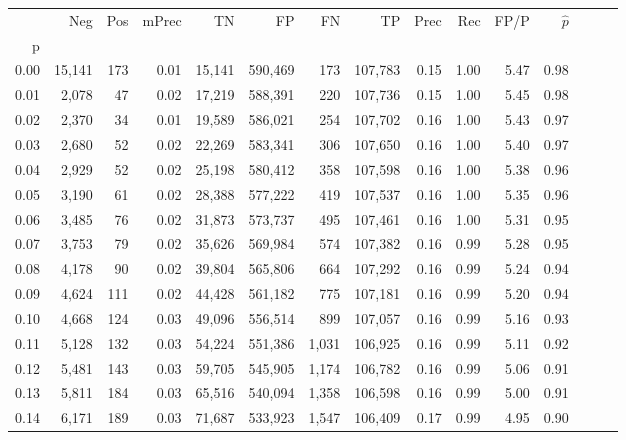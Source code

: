 \begin{tabular}{rrrrrrrrrrrrrrr}
\toprule
{} &     Neg &    Pos & mPrec &       TN &       FP &       FN &       TP &  Prec &   Rec &  FP/P & $\hat{p}$ \\
p    &         &        &       &          &          &          &          &       &       &       &           \\
\midrule
0.00 &  15,141 &    173 &  0.01 &   15,141 &  590,469 &      173 &  107,783 &  0.15 &  1.00 &  5.47 &      0.98 \\
0.01 &   2,078 &     47 &  0.02 &   17,219 &  588,391 &      220 &  107,736 &  0.15 &  1.00 &  5.45 &      0.98 \\
0.02 &   2,370 &     34 &  0.01 &   19,589 &  586,021 &      254 &  107,702 &  0.16 &  1.00 &  5.43 &      0.97 \\
0.03 &   2,680 &     52 &  0.02 &   22,269 &  583,341 &      306 &  107,650 &  0.16 &  1.00 &  5.40 &      0.97 \\
0.04 &   2,929 &     52 &  0.02 &   25,198 &  580,412 &      358 &  107,598 &  0.16 &  1.00 &  5.38 &      0.96 \\
0.05 &   3,190 &     61 &  0.02 &   28,388 &  577,222 &      419 &  107,537 &  0.16 &  1.00 &  5.35 &      0.96 \\
0.06 &   3,485 &     76 &  0.02 &   31,873 &  573,737 &      495 &  107,461 &  0.16 &  1.00 &  5.31 &      0.95 \\
0.07 &   3,753 &     79 &  0.02 &   35,626 &  569,984 &      574 &  107,382 &  0.16 &  0.99 &  5.28 &      0.95 \\
0.08 &   4,178 &     90 &  0.02 &   39,804 &  565,806 &      664 &  107,292 &  0.16 &  0.99 &  5.24 &      0.94 \\
0.09 &   4,624 &    111 &  0.02 &   44,428 &  561,182 &      775 &  107,181 &  0.16 &  0.99 &  5.20 &      0.94 \\
0.10 &   4,668 &    124 &  0.03 &   49,096 &  556,514 &      899 &  107,057 &  0.16 &  0.99 &  5.16 &      0.93 \\
0.11 &   5,128 &    132 &  0.03 &   54,224 &  551,386 &    1,031 &  106,925 &  0.16 &  0.99 &  5.11 &      0.92 \\
0.12 &   5,481 &    143 &  0.03 &   59,705 &  545,905 &    1,174 &  106,782 &  0.16 &  0.99 &  5.06 &      0.91 \\
0.13 &   5,811 &    184 &  0.03 &   65,516 &  540,094 &    1,358 &  106,598 &  0.16 &  0.99 &  5.00 &      0.91 \\
0.14 &   6,171 &    189 &  0.03 &   71,687 &  533,923 &    1,547 &  106,409 &  0.17 &  0.99 &  4.95 &      0.90 \\

\end{tabular}
